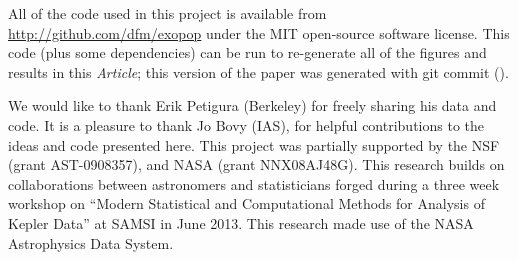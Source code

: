 \documentclass[12pt,preprint]{aastex}
\newcommand{\project}[1]{{\sffamily #1}}
\newcommand{\paper}{\textsl{Article}}
\begin{document}
All of the code used in this project is available from
\url{http://github.com/dfm/exopop} under the MIT open-source software license.
This code (plus some dependencies) can be run to re-generate all of the
figures and results in this \paper; this version of the paper was generated
with git commit \texttt{\githash} (\gitdate).

\acknowledgments
We would like to thank Erik Petigura (Berkeley) for freely sharing his data
and code.
It is a pleasure to thank
Jo Bovy (IAS),
for helpful contributions to the ideas and code presented here.
This project was partially supported by the NSF (grant AST-0908357), and NASA
(grant NNX08AJ48G).
This research builds on collaborations between astronomers and statisticians
forged during a three week workshop on ``Modern Statistical and Computational
Methods for Analysis of Kepler Data'' at SAMSI in June 2013.
This research made use of the NASA \project{Astrophysics Data System}.
\end{document}
